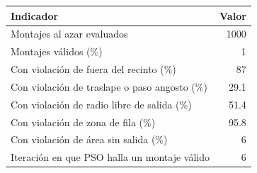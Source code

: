 \begin{tabular}{lr}
\toprule
Indicador & Valor \\
\midrule
Montajes al azar evaluados & 1000 \\
Montajes válidos (\%) & 1 \\
Con violación de fuera del recinto (\%) & 87 \\
Con violación de traslape o paso angosto (\%) & 29.1 \\
Con violación de radio libre de salida (\%) & 51.4 \\
Con violación de zona de fila (\%) & 95.8 \\
Con violación de área sin salida (\%) & 6 \\
Iteración en que PSO halla un montaje válido & 6 \\
\bottomrule
\end{tabular}
